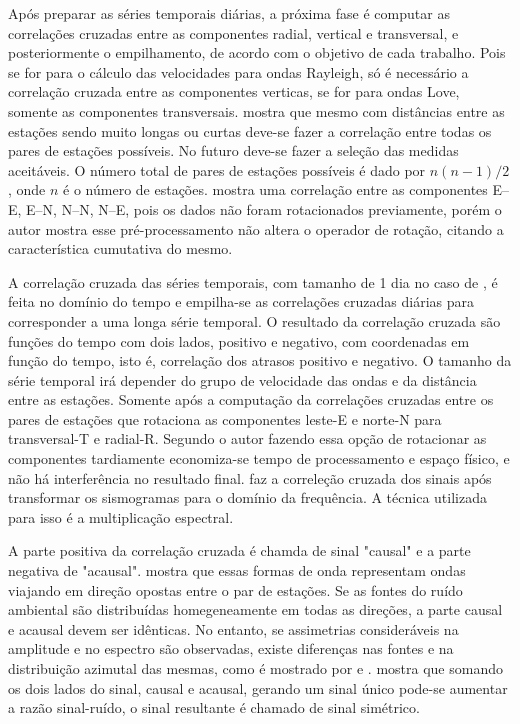 \documentclass[paper,twocolumn]{geophysics}
\begin{document}
Após preparar as séries temporais diárias, a próxima fase é computar as correlações cruzadas entre as componentes radial, vertical e transversal, e posteriormente o empilhamento, de acordo com o objetivo de cada trabalho. Pois se for para o cálculo das velocidades para ondas Rayleigh, só é necessário a correlação cruzada entre as componentes verticas, se for para ondas Love, somente as componentes transversais. \cite{bensen_processing_2007} mostra que mesmo com distâncias entre as estações sendo muito longas ou curtas deve-se fazer a correlação entre todas os pares de estações possíveis. No futuro deve-se fazer a seleção das medidas aceitáveis. O número total de pares de estações possíveis é dado por $n(n-1)/2$, onde $n$ é o número de estações. \cite{lin_surface_2008} mostra uma correlação entre as componentes E–E, E–N, N–N, N–E, pois os dados não foram rotacionados previamente, porém o autor mostra esse pré-processamento não altera o operador de rotação, citando a característica cumutativa do mesmo.

A correlação cruzada das séries temporais, com tamanho de 1 dia no caso de  \cite{bensen_processing_2007}, é feita no domínio do tempo e empilha-se as correlações cruzadas diárias para corresponder a uma longa série temporal. O resultado da correlação cruzada são funções do tempo com dois lados, positivo e negativo, com coordenadas em função do tempo, isto é, correlação dos atrasos positivo e negativo. O tamanho da série temporal irá depender do grupo de velocidade das ondas e da distância entre as estações. Somente após a computação da correlações cruzadas entre os pares de estações que \cite{lin_surface_2008} rotaciona as componentes leste-E e norte-N para transversal-T e radial-R. Segundo o autor fazendo essa opção de rotacionar as componentes tardiamente economiza-se tempo de processamento e espaço físico, e não há interferência no resultado final.  \cite{ekstrom_determination_2009} faz a correleção cruzada dos sinais após transformar os sismogramas para o domínio da frequência. A técnica utilizada para isso é a multiplicação espectral. 

A parte positiva da correlação cruzada é chamda de sinal "causal" e a parte negativa de "acausal". \cite{bensen_processing_2007} mostra que essas formas de onda representam ondas viajando em direção opostas entre o par de estações. Se as fontes do ruído ambiental são distribuídas homegeneamente em todas as direções, a parte causal e acausal devem ser idênticas. No entanto, se assimetrias consideráveis na amplitude e no espectro são observadas, existe diferenças nas fontes e na distribuição azimutal das mesmas, como é mostrado por \cite{schulte-pelkum_strong_2004} e \cite{stehly_study_2006}. \cite{bensen_processing_2007} mostra que somando os dois lados do sinal, causal e acausal, gerando um sinal único pode-se aumentar a razão sinal-ruído, o sinal resultante é chamado de sinal simétrico.
\end{document}
